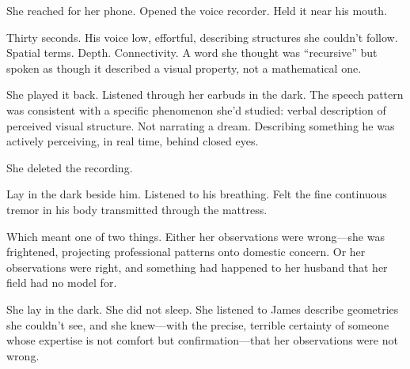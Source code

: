 She reached for her phone. Opened the voice recorder. Held it near his mouth.

Thirty seconds. His voice low, effortful, describing structures she couldn't follow. Spatial terms. Depth. Connectivity. A word she thought was ``recursive'' but spoken as though it described a visual property, not a mathematical one.

She played it back. Listened through her earbuds in the dark. The speech pattern was consistent with a specific phenomenon she'd studied: verbal description of perceived visual structure. Not narrating a dream. Describing something he was actively perceiving, in real time, behind closed eyes.

She deleted the recording.

Lay in the dark beside him. Listened to his breathing. Felt the fine continuous tremor in his body transmitted through the mattress.

Which meant one of two things. Either her observations were wrong---she was frightened, projecting professional patterns onto domestic concern. Or her observations were right, and something had happened to her husband that her field had no model for.

She lay in the dark. She did not sleep. She listened to James describe geometries she couldn't see, and she knew---with the precise, terrible certainty of someone whose expertise is not comfort but confirmation---that her observations were not wrong.
